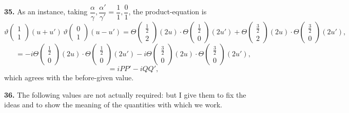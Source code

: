 \documentclass[11pt]{article}
\begin{document}
\medskip

\textbf{35.} As an instance, taking $\dfrac{\alpha}{\gamma},\dfrac{\alpha'}{\gamma'} = \dfrac{1}{1},\dfrac{0}{1}$, the product-equation is
\[
\vartheta\!\begin{pmatrix} 1 \\ 1 \end{pmatrix}\!(u + u')\,\vartheta\!\begin{pmatrix} 0 \\ 1 \end{pmatrix}\!(u - u') = \Theta\!\begin{pmatrix} \tfrac{1}{2} \\ 2 \end{pmatrix}\!(2u)\cdot \Theta\!\begin{pmatrix} \tfrac{1}{2} \\ 0 \end{pmatrix}\!(2u') + \Theta\!\begin{pmatrix} \tfrac{3}{2} \\ 2 \end{pmatrix}\!(2u)\cdot \Theta\!\begin{pmatrix} \tfrac{3}{2} \\ 0 \end{pmatrix}\!(2u'),
\]
\[
= -i\Theta\!\begin{pmatrix} \tfrac{1}{2} \\ 0 \end{pmatrix}\!(2u)\cdot \Theta\!\begin{pmatrix} \tfrac{1}{2} \\ 0 \end{pmatrix}\!(2u') - i\Theta\!\begin{pmatrix} \tfrac{3}{2} \\ 0 \end{pmatrix}\!(2u)\cdot \Theta\!\begin{pmatrix} \tfrac{3}{2} \\ 0 \end{pmatrix}\!(2u'),
\]
\[
= iPP' - iQQ',
\]
which agrees with the before-given value.

\medskip

\textbf{36.} The following values are not actually required: but I give them to fix the ideas and to show the meaning of the quantities with which we work.

\medskip
\end{document}
